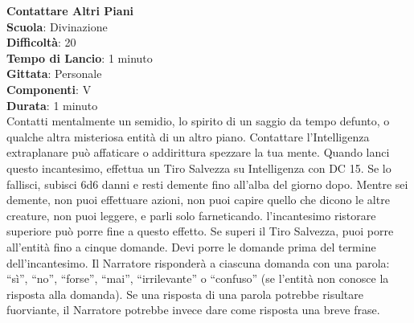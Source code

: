 \begin{multicols}{2}
\medskip\textbf{Contattare Altri Piani}\\
\textbf{Scuola}: Divinazione\\
\textbf{Difficoltà}:  20\\
\textbf{Tempo di Lancio}: 1 minuto\\
\textbf{Gittata}: Personale\\
\textbf{Componenti}: V\\
\textbf{Durata}: 1 minuto\\
Contatti mentalmente un semidio, lo spirito di un saggio da tempo defunto, o qualche altra misteriosa entità di un altro piano. Contattare l’Intelligenza extraplanare può affaticare o addirittura spezzare la tua mente. Quando lanci questo incantesimo, effettua un Tiro Salvezza su Intelligenza con DC 15. Se lo fallisci, subisci 6d6 danni e resti demente fino all'alba del giorno dopo. Mentre sei demente, non puoi effettuare azioni, non puoi capire quello che dicono le altre creature, non puoi leggere, e parli solo farneticando. l'incantesimo ristorare superiore può porre fine a questo effetto. Se superi il Tiro Salvezza, puoi porre all'entità fino a cinque domande. Devi porre le domande prima del termine dell'incantesimo. Il Narratore risponderà a ciascuna domanda con una parola: “sì”, “no”, “forse”, “mai”, “irrilevante” o “confuso” (se l’entità non conosce la risposta alla domanda). Se una risposta di una parola
potrebbe risultare fuorviante, il Narratore potrebbe invece dare come risposta una breve frase.



\end{multicols}

